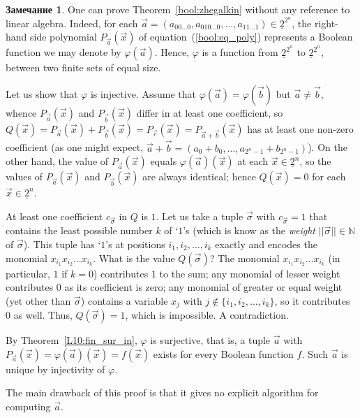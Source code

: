 \documentclass[12pt,notitlepage]{article}
\theoremstyle{plain}
\theoremstyle{definition}
\newtheorem{rem}[thm]{Замечание}
\theoremstyle{plain}
\newcommand{\N}{\mathbb{N}}
\renewcommand{\phi}{\varphi}
\newcommand{\ul}[1]{\underline{#1}}
\newcommand{\1}{\mathbf{1}}
\newcommand{\0}{\mathbf{0}}
\begin{document}
\begin{rem}
	One can prove Theorem~\ref{bool:zhegalkin} without any reference to linear algebra. Indeed, for each $\vec a = (a_{00\ldots0}, a_{010\ldots0}, \ldots, a_{11\ldots1}) \in \ul{2}^{2^n}$, the right-hand side polynomial $P_{\vec a}(\vec x)$ of equation~(\ref{bool:eq_poly}) represents a Boolean function we may denote by $\phi(\vec a)$. Hence, $\phi$ is a function from $\ul{2}^{2^n}$ to $\ul{2}^{\ul{2}^n}$, between two finite sets of equal size.
	
	Let us show that $\phi$ is injective. Assume that $\phi(\vec a) = \phi(\vec b)$ but $\vec a \neq \vec b$, whence $P_{\vec a}(\vec x)$ and $P_{\vec b}(\vec x)$ differ in at least one coefficient, so  $Q(\vec x) = P_{\vec a}(\vec x)+ P_{\vec b}(\vec x) = P_{\vec c}(\vec x) = P_{\vec a + \vec b}(\vec x)$ has at least one non-zero coefficient (as one might expect, $\vec a + \vec b = (a_0 + b_0, \ldots, a_{2^n - 1} + b_{2^n - 1})$). On the other hand, the value of $P_{\vec a}(\vec x)$ equals $\phi(\vec a)(\vec x)$ at each $\vec x \in \ul{2}^n$, so the values of $P_{\vec a}(\vec x)$ and $P_{\vec b}(\vec x)$ are always identical; hence $Q(\vec x) = 0$ for each $\vec x \in \ul{2}^n$.
	
	At least one coefficient $c_{\vec \sigma}$ in $Q$ is $1$. Let us take a tuple $\vec \sigma$ with $c_{\vec \sigma} = 1$ that contains the least possible number $k$ of `$1$'s (which is know as the \emph{weight} $||\vec \sigma|| \in \N$ of $\vec\sigma$). This tuple has `$1$'s at positions $i_1, i_2, \ldots, i_k$ exactly and encodes the monomial $x_{i_1} x_{i_2} \ldots x_{i_k}$. What is the value $Q(\vec \sigma)$? The monomial $x_{i_1} x_{i_2} \ldots x_{i_k}$ (in particular, $1$ if $k = 0$) contributes $1$ to the sum; any monomial of lesser weight contributes $0$ as its coefficient is zero; any monomial of greater or equal weight (yet other than $\vec \sigma$) contains a variable $x_j$ with $j \notin \{i_1, i_2, \ldots, i_k \}$, so it contributes $0$ as well. Thus, $Q(\vec \sigma) = 1$, which is impossible. A contradiction.
	
	By Theorem~\ref{L10:fin_sur_in}, $\phi$ is surjective, that is, a tuple $\vec a$ with $P_{\vec a}(\vec x) = \phi(\vec a)(\vec x) = f(\vec x)$ exists for every Boolean function $f$. Such $\vec a$ is unique by injectivity of $\phi$.
	
	The main drawback of this proof is that it gives no explicit algorithm for computing $\vec a$.
\end{rem}
\end{document}
